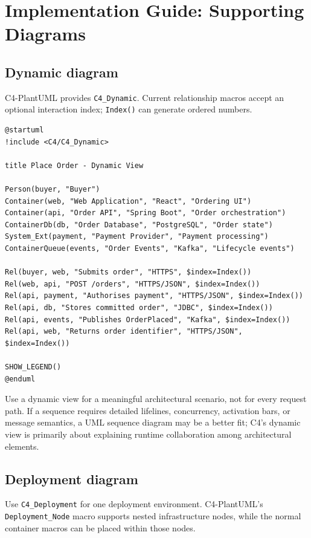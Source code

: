 \documentclass[11pt]{article}
\newcommand{\code}[1]{\texttt{#1}}
\begin{document}
\section{Implementation Guide: Supporting Diagrams}

\subsection{Dynamic diagram}

C4-PlantUML provides \code{C4\_Dynamic}. Current relationship macros accept an optional interaction index; \code{Index()} can generate ordered numbers.\cite{c4plantuml}

\begin{lstlisting}[language=PlantUML]
@startuml
!include <C4/C4_Dynamic>

title Place Order - Dynamic View

Person(buyer, "Buyer")
Container(web, "Web Application", "React", "Ordering UI")
Container(api, "Order API", "Spring Boot", "Order orchestration")
ContainerDb(db, "Order Database", "PostgreSQL", "Order state")
System_Ext(payment, "Payment Provider", "Payment processing")
ContainerQueue(events, "Order Events", "Kafka", "Lifecycle events")

Rel(buyer, web, "Submits order", "HTTPS", $index=Index())
Rel(web, api, "POST /orders", "HTTPS/JSON", $index=Index())
Rel(api, payment, "Authorises payment", "HTTPS/JSON", $index=Index())
Rel(api, db, "Stores committed order", "JDBC", $index=Index())
Rel(api, events, "Publishes OrderPlaced", "Kafka", $index=Index())
Rel(api, web, "Returns order identifier", "HTTPS/JSON", $index=Index())

SHOW_LEGEND()
@enduml
\end{lstlisting}

Use a dynamic view for a meaningful architectural scenario, not for every request path. If a sequence requires detailed lifelines, concurrency, activation bars, or message semantics, a UML sequence diagram may be a better fit; C4's dynamic view is primarily about explaining runtime collaboration among architectural elements.\cite{c4dynamic}

\subsection{Deployment diagram}

Use \code{C4\_Deployment} for one deployment environment. C4-PlantUML's \code{Deployment\_Node} macro supports nested infrastructure nodes, while the normal container macros can be placed within those nodes.\cite{c4plantuml}
\end{document}
